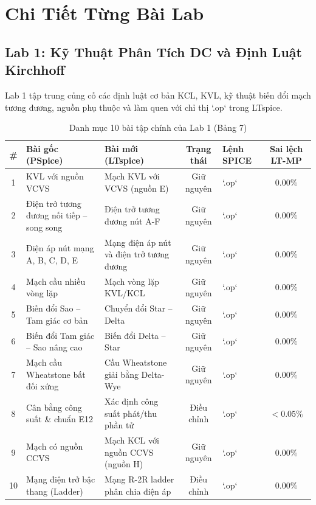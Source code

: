 \documentclass[12pt,a4paper]{report}
\begin{document}
\chapter{Chi Tiết Từng Bài Lab}

\section{Lab 1: Kỹ Thuật Phân Tích DC và Định Luật Kirchhoff}
Lab 1 tập trung củng cố các định luật cơ bản KCL, KVL, kỹ thuật biến đổi mạch tương đương, nguồn phụ thuộc và làm quen với chỉ thị `.op` trong LTspice.

\begin{table}[H]
\centering
\caption{Danh mục 10 bài tập chính của Lab 1 (Bảng 7)}
\label{tab:lab1_details}
\renewcommand{\arraystretch}{1.2}
\small
\begin{tabularx}{\textwidth}{|c|p{4.2cm}|p{4.0cm}|c|l|c|}
\hline
\rowcolor{codebg}
\textbf{\#} & \textbf{Bài gốc (PSpice)} & \textbf{Bài mới (LTspice)} & \textbf{Trạng thái} & \textbf{Lệnh SPICE} & \textbf{Sai lệch LT-MP} \\ \hline
1 & KVL với nguồn VCVS & Mạch KVL với VCVS (nguồn E) & Giữ nguyên & `.op` & $0.00\%$ \\ \hline
2 & Điện trở tương đương nối tiếp -- song song & Điện trở tương đương nút A-F & Giữ nguyên & `.op` & $0.00\%$ \\ \hline
3 & Điện áp nút mạng A, B, C, D, E & Mạng điện áp nút và điện trở tương đương & Giữ nguyên & `.op` & $0.00\%$ \\ \hline
4 & Mạch cầu nhiều vòng lặp & Mạch vòng lặp KVL/KCL & Giữ nguyên & `.op` & $0.00\%$ \\ \hline
5 & Biến đổi Sao -- Tam giác cơ bản & Chuyển đổi Star -- Delta & Giữ nguyên & `.op` & $0.00\%$ \\ \hline
6 & Biến đổi Tam giác -- Sao nâng cao & Biến đổi Delta -- Star & Giữ nguyên & `.op` & $0.00\%$ \\ \hline
7 & Mạch cầu Wheatstone bất đối xứng & Cầu Wheatstone giải bằng Delta-Wye & Giữ nguyên & `.op` & $0.00\%$ \\ \hline
8 & Cân bằng công suất \& chuẩn E12 & Xác định công suất phát/thu phần tử & Điều chỉnh & `.op` & $<0.05\%$ \\ \hline
9 & Mạch có nguồn CCVS & Mạch KCL với nguồn CCVS (nguồn H) & Giữ nguyên & `.op` & $0.00\%$ \\ \hline
10 & Mạng điện trở bậc thang (Ladder) & Mạng R-2R ladder phân chia điện áp & Điều chỉnh & `.op` & $0.00\%$ \\ \hline
\end{tabularx}
\end{table}
\end{document}
